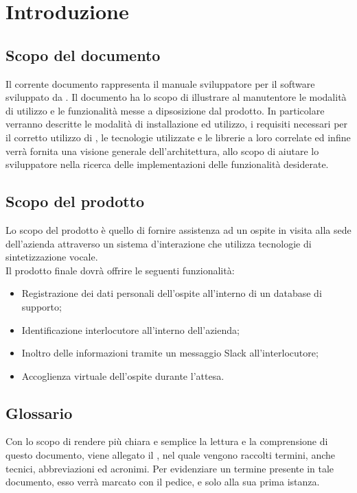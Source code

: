 \documentclass[../ManualeSviluppatore_v1.0.0.tex]{subfiles}
\begin{document}
\section{Introduzione}

	\subsection{Scopo del documento}
	Il corrente documento rappresenta il manuale sviluppatore per il software \atavi sviluppato da \kpanic. Il documento ha lo scopo di illustrare al manutentore le modalità di utilizzo e le funzionalità messe a dipsosizione dal prodotto. In particolare verranno descritte le modalità di installazione ed utilizzo, i requisiti necessari per il corretto utilizzo di \atavi, le tecnologie utilizzate e le librerie a loro correlate ed infine verrà fornita una visione generale dell'architettura, allo scopo di aiutare lo sviluppatore nella ricerca delle implementazioni delle funzionalità desiderate.
	
	\subsection{Scopo del prodotto}
	Lo scopo del prodotto è quello di fornire assistenza ad un \gls{ospite} in visita alla sede dell'azienda attraverso un sistema d'interazione che utilizza \gls{tecnologie di sintetizzazione vocale}.
	\\Il prodotto finale dovrà offrire le seguenti funzionalità:
	\begin{itemize}
		\item Registrazione dei dati personali dell'ospite all'interno di un database di supporto;
		\item Identificazione \gls{interlocutore} all'interno dell'azienda;
		\item Inoltro delle informazioni tramite un messaggio \gls{Slack} all'interlocutore;
		\item Accoglienza virtuale dell'ospite durante l'attesa.
	\end{itemize}

	\subsection{Glossario}
	Con lo scopo di rendere più chiara e semplice la lettura e la comprensione di questo documento, viene allegato il \glossariov, nel quale vengono raccolti termini, anche tecnici, abbreviazioni ed acronimi. Per evidenziare un termine presente in tale documento, esso verrà marcato con il pedice, e solo alla sua prima istanza.
	
\end{document}
